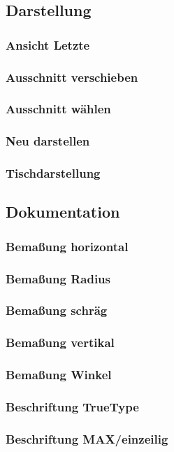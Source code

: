 \documentclass[a4paper]{book}
\begin{document}
		\subsection{Darstellung}
			\subsubsection{Ansicht Letzte} 
			\subsubsection{Ausschnitt verschieben} 
			\subsubsection{Ausschnitt wählen} 
			\subsubsection{Neu darstellen} 
			\subsubsection{Tischdarstellung} 
		\subsection{Dokumentation}
			\subsubsection{Bemaßung horizontal} 
			\subsubsection{Bemaßung Radius} 
			\subsubsection{Bemaßung schräg} 
			\subsubsection{Bemaßung vertikal} 
			\subsubsection{Bemaßung Winkel} 
			\subsubsection{Beschriftung TrueType} 
			\subsubsection{Beschriftung MAX/einzeilig} 
\end{document}
